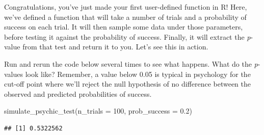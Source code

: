 \documentclass[
]{book}
\newenvironment{Shaded}{\begin{snugshade}}{\end{snugshade}}
\newcommand{\AttributeTok}[1]{\textcolor[rgb]{0.77,0.63,0.00}{#1}}
\newcommand{\CommentTok}[1]{\textcolor[rgb]{0.56,0.35,0.01}{\textit{#1}}}
\newcommand{\ControlFlowTok}[1]{\textcolor[rgb]{0.13,0.29,0.53}{\textbf{#1}}}
\newcommand{\DecValTok}[1]{\textcolor[rgb]{0.00,0.00,0.81}{#1}}
\newcommand{\FloatTok}[1]{\textcolor[rgb]{0.00,0.00,0.81}{#1}}
\newcommand{\FunctionTok}[1]{\textcolor[rgb]{0.00,0.00,0.00}{#1}}
\newcommand{\NormalTok}[1]{#1}
\newcommand{\OtherTok}[1]{\textcolor[rgb]{0.56,0.35,0.01}{#1}}
\newcommand{\SpecialCharTok}[1]{\textcolor[rgb]{0.00,0.00,0.00}{#1}}
\begin{document}
\begin{Shaded}
\end{Shaded}

Congratulations, you've just made your first user-defined function in R! Here, we've defined a function that will take a number of trials and a probability of success on each trial. It will then sample some data under those parameters, before testing it against the probability of success. Finally, it will extract the \emph{p}-value from that test and return it to you. Let's see this in action.

Run and rerun the code below several times to see what happens. What do the \emph{p}-values look like? Remember, a value below 0.05 is typical in psychology for the cut-off point where we'll reject the null hypothesis of no difference between the observed and predicted probabilities of success.

\begin{Shaded}
\begin{Highlighting}[]
\FunctionTok{simulate\_psychic\_test}\NormalTok{(}\AttributeTok{n\_trials =} \DecValTok{100}\NormalTok{, }\AttributeTok{prob\_success =} \FloatTok{0.2}\NormalTok{)}
\end{Highlighting}
\end{Shaded}

\begin{verbatim}
## [1] 0.5322562
\end{verbatim}
\end{document}
